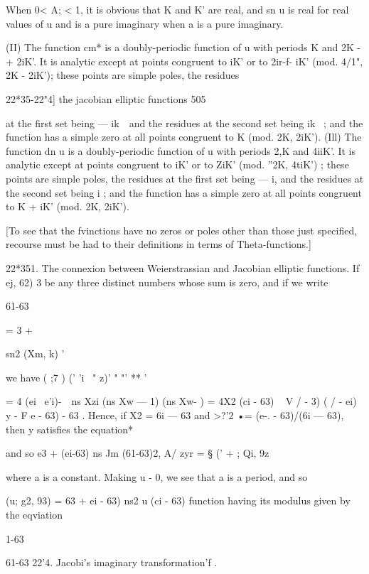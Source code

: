 When 0< A; < 1, it is obvious that K and K' are real, and sn u is real
for real values of u and is a pure imaginary when a is a pure
imaginary.

(II) The function cm* is a doubly-periodic function of u with periods
K and 2K -+ 2iK'. It is analytic except at points congruent to iK' or
to 2ir-f- iK' (mod. 4/1", 2K - 2iK'); these points are simple poles,
the residues



22*35-22"4] the jacobian elliptic functions 505

at the first set being — ik~\ and the residues at the second set being
ik~ ; and the function has a simple zero at all points congruent to K
(mod. 2K, 2iK'). (Ill) The function dn u is a doubly-periodic function
of u with periods 2,K and 4iiK'. It is analytic except at points
congruent to iK' or to ZiK' (mod. ''2K, 4tiK') ; these points are
simple poles, the residues at the first set being — i, and the
residues at the second set being i ; and the function has a simple
zero at all points congruent to K + iK' (mod. 2K, 2iK').

[To see that the fvinctions have no zeros or poles other than those
just specified, recourse must be had to their definitions in terms of
Theta-functions.]

22*351. The connexion between Weierstrassian and Jacobian elliptic
functions. If ej, 62) 3 be any three distinct numbers whose sum is
zero, and if we write

61-63



  = 3 +



sn2 (Xm, k) '



we have ( ;7 ) (' 'i ~" z)' " "' ** '

= 4 (ei ~e'i)-\ \ ns Xzi (ns Xw — 1) (ns Xw- ) = 4X2 (ci - 63) ~ V / -
3) ( / - ei) y - F e - 63) - 63 . Hence, if X2 = 6i — 63 and >?'2 •=
(e-. - 63)/(6i — 63), then y satisfies the equation*

and so e3 + (ei-63) ns Jm (61-63)2, A/ zyr = § (' + ; Qi, 9z\

where a is a constant. Making u - 0, we see that a is a period, and so

  (u; g2, 93) = 63 + ei - 63) ns2 u (ci - 63)%
function having its modulus given by the eqviation

1-63



61-63 22'4. Jacobi's imaginary transformation'f .

